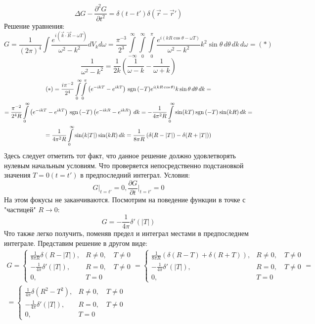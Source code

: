 \[
	\Delta G - \frac{\partial^2 G}{\partial t^2} = \delta(t - t')\delta(\vec{r} - \vec{r}') 
\]
Решение уравнения:
\[
	G = \frac{1}{(2\pi)^{4}} \int \frac{e^{i(\vec{k}\cdot\vec{R} - \omega T)}}{\omega^2 - k^2} dV_k d\omega =  
	\frac{\pi^{-3}}{2^3} 
	\int\limits_{-\infty}^{\infty}\!
	\int\limits_{0}^{\infty}\!
	\int\limits_{0}^{\pi}
	\frac{e^{i(k R \cos \theta - \omega T)}}{\omega^2 - k^2} k^{2} \sin \theta\, d\theta\, dk\, d\omega = (*)
	\]
	\[
	\frac{1}{\omega^2 - k^2} = \frac{1}{2k} \left(\frac{1}{\omega - k} - \frac{1}{\omega + k} \right)
	\]
	\[
	\begin{gathered}
	(*) =
	\frac{i \pi^{-2}}{2^{4}} 
	\int\limits_{0}^{\infty}\!
	\int\limits_{0}^{\pi}
	\left(e^{ - i k T}  - e^{i k T} \right) \mathrm{\,sgn}\,(-T)
	e^{i(k R \cos \theta)} 
	k \sin \theta\, d\theta\, dk
	= \\ =
	\frac{\pi^{-2}}{2^{4} R} 
	\int\limits_{0}^{\infty}
	\left(e^{ - i k T}  - e^{i k T} \right) \mathrm{\,sgn}\,(-T)
	\left(e^{-i k R} - e^{i k R} \right)
	\,dk =
	-\frac{1}{4\pi^2 R} 
	\int\limits_{0}^{\infty}
	\sin(kT) \mathrm{\,sgn}\,(-T)
	\sin(kR)
	\,dk
	= \\ =
	\frac{1}{4\pi^{2} R} 
	\int\limits_{0}^{\infty}
	\sin(k|T|)
	\sin(kR)
	\,dk
	= 
	\frac{1}{8\pi R} 
	\left(\delta(R - |T|)
	-
	\delta(R + |T|) \right)
	\end{gathered} 
\]
Здесь следует отметить тот факт, что данное решение должно удовлетворять нулевым начальным условиям. Что проверяется непосредственно подстановкой значения $T = 0 (t = t')$ в предпоследний интеграл. Условия:
\[
	G \Big|_{t = t'} = 0, \frac{\partial G}{\partial t} \Big|_{t = t'} = 0
\]
На этом фокусы не заканчиваются. Посмотрим на поведение функции в точке с "частицей" $R \to 0$:
\[
	G = - \frac{1}{4\pi} \delta'(|T|)
\]
Что также легко получить, поменяв предел и интеграл местами в предпоследнем интеграле. Представим решение в другом виде:
\[
	\begin{gathered}
	G = 
	\begin{cases}
	\frac{1}{8\pi R} \delta(R - |T|), & R \ne 0, \quad T \ne 0 \\
	- \frac{1}{4\pi} \delta'(|T|), & R = 0, \quad T \ne 0 \\
	0, & T = 0
	\end{cases}
	= 
	\begin{cases}
	\frac{1}{8\pi R} (\delta(R - T) + \delta(R + T)), & R \ne 0, \quad T \ne 0 \\
	- \frac{1}{4\pi} \delta'(|T|), & R = 0, \quad T \ne 0 \\
	0, & T = 0
	\end{cases}
	= \\ =
	\begin{cases}
	\frac{1}{4\pi} \delta(R^2 - T^2), & R \ne 0, \quad T \ne 0 \\
	- \frac{1}{4\pi} \delta'(|T|), & R = 0, \quad T \ne 0 \\
	0, & T = 0
	\end{cases}
	\end{gathered}
\]

